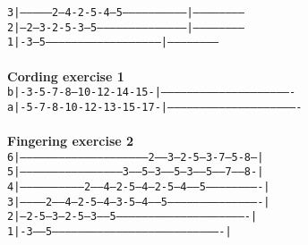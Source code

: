 \documentclass[12pt]{extarticle}
\def\code#1{\texttt{#1}}
\begin{document}
\code{3|---------------2---4-2-5-4---5-----------------------------|------------------------}\\
\code{2|---2---3-2-5-3---5-----------------------------------------|------------------------}\\
\code{1|-3---5-----------------------------------------------------|------------------------}\\\\
\textbf{Cording exercise 1}\\
\code{b|-3-5-7-8--10-12-14-15-|-------------------------------------------------------------}\\
\code{a|-5-7-8-10-12-13-15-17-|-------------------------------------------------------------}\\\\
\textbf{Fingering exercise 2} \\
\code{6|-----------------------------------------------------------2-----3---2-5---3-7---5-8---|}\\
\code{5|-----------------------------------------------3-----5---3-----5---3-----5-----7-----8-|}\\
\code{4|-----------------------------2-----4---2-5---4---2-5---4-----5-------------------------|}\\
\code{3|-----------2-----4---2-5---4---3-5---4-----5-------------------------------------------|}\\
\code{2|---2-5---3---2-5---3-----5-------------------------------------------------------------|}\\
\code{1|-3-----5-------------------------------------------------------------------------------|}\\\\
\end{document}
